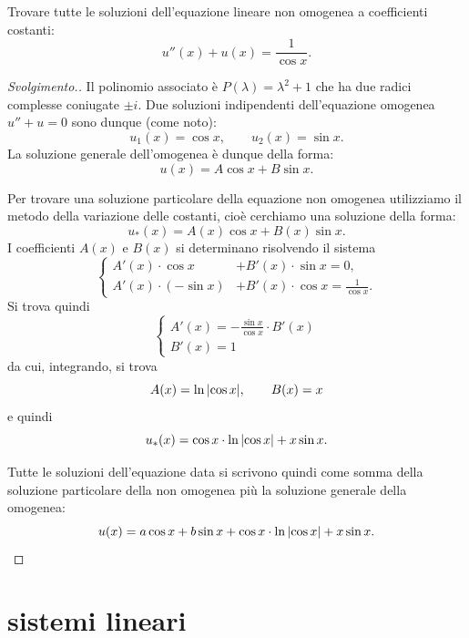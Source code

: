 \begin{exercise}
Trovare tutte le soluzioni dell'equazione lineare non omogenea a coefficienti
costanti:
\[
  u''(x) + u(x) = \frac{1}{\cos x}.    
\]
\end{exercise}
\begin{proof}[Svolgimento.]
Il polinomio associato è $P(\lambda) = \lambda^2 + 1$ che 
ha due radici complesse coniugate $\pm i$.
Due soluzioni indipendenti dell'equazione omogenea $u''+u=0$ sono dunque 
(come noto):
\[
 u_1(x) = \cos x, \qquad u_2(x) = \sin x.
\]
La soluzione generale dell'omogenea è dunque della forma:
\[
  u(x) = A \cos x + B \sin x.  
\]

Per trovare una soluzione particolare della equazione non omogenea 
utilizziamo il metodo della variazione delle costanti, cioè
cerchiamo una soluzione della forma:
\[
  u_*(x) = A(x) \cos x + B(x) \sin x.
\]
I coefficienti $A(x)$ e $B(x)$ si determinano risolvendo il sistema 
\[
\begin{cases}
  A'(x) \cdot \cos x &+ B'(x)\cdot \sin x = 0, \\
  A'(x) \cdot (-\sin x) &+ B'(x)\cdot \cos x = \frac{1}{\cos x}.
\end{cases}  
\]
Si trova quindi 
\[
 \begin{cases}
  A'(x) = -\frac{\sin x}{\cos x} \cdot B'(x) \\
  B'(x) = 1
 \end{cases}  
\]
da cui, integrando, si trova
\[
  A(x) = \ln{\left|\cos x\right|}, \qquad B(x) = x
\]
e quindi 
\[
 u_*(x) = \cos x\cdot \ln {\left|\cos x \right|} + x\sin x.  
\]

Tutte le soluzioni dell'equazione data si scrivono quindi come somma della 
soluzione particolare della non omogenea più la soluzione generale della 
omogenea:
\[
 u(x) = a \cos x + b \sin x + \cos x \cdot \ln {\left|\cos x\right|} + x \sin x.  
\]
\end{proof}

\section{sistemi lineari}

